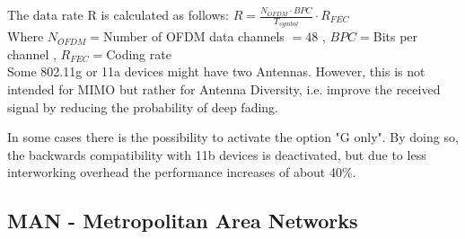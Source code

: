 	The data rate R is calculated as follows: $R=\frac{N_{OFDM}\cdot BPC}{T_{symbol}}\cdot R_{FEC}$ \\
	Where $N_{OFDM}=$Number of OFDM data channels $=48$ , $BPC=$Bits per channel , $R_{FEC}=$Coding rate \\
	
	Some 802.11g or 11a devices might have two Antennas. However, this is not intended for MIMO but rather
	for Antenna Diversity, i.e. improve the received signal by reducing the probability of deep fading. 

	In some cases there is the possibility to activate the option "G only". By doing so, the backwards
	compatibility with 11b devices is deactivated, but due to less interworking overhead the performance
	increases of about 40\%.
	
\subsection{MAN - Metropolitan Area Networks}
